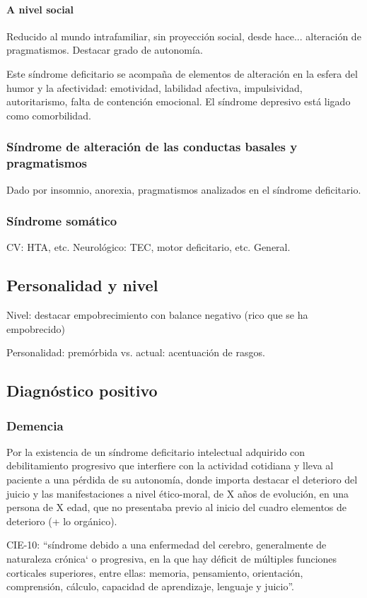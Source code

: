 \paragraph{A nivel social}
Reducido al mundo intrafamiliar, sin proyección social, desde hace... alteración de pragmatismos. Destacar grado de autonomía. 

Este síndrome deficitario se acompaña de elementos de alteración en la esfera del humor y la afectividad: emotividad, labilidad afectiva, impulsividad, autoritarismo, falta de contención emocional. El síndrome depresivo está ligado como comorbilidad.
\subsubsection*{Síndrome de alteración de las conductas basales y pragmatismos}
Dado por insomnio, anorexia, pragmatismos analizados en el síndrome deficitario.
\subsubsection*{Síndrome somático}
CV: HTA, etc. Neurológico: TEC, motor deficitario, etc. General.
\subsection*{Personalidad y nivel}
Nivel: destacar empobrecimiento con balance negativo (rico que se ha empobrecido)

Personalidad: premórbida vs. actual: acentuación de rasgos.

\subsection*{Diagnóstico positivo}
\subsubsection*{Demencia}
Por la existencia de un síndrome deficitario intelectual adquirido con debilitamiento progresivo que interfiere con la actividad cotidiana y lleva al paciente a una pérdida de su autonomía, donde importa destacar el deterioro del juicio y las manifestaciones a nivel ético-moral, de X años de evolución, en una persona de X edad, que no presentaba previo al inicio del cuadro elementos de deterioro (+ lo orgánico).

CIE-10: “síndrome debido a una enfermedad del cerebro, generalmente de naturaleza crónica` o progresiva, en la que hay déficit de múltiples funciones corticales superiores, entre ellas: memoria, pensamiento, orientación, comprensión, cálculo, capacidad de aprendizaje, lenguaje y juicio”.

